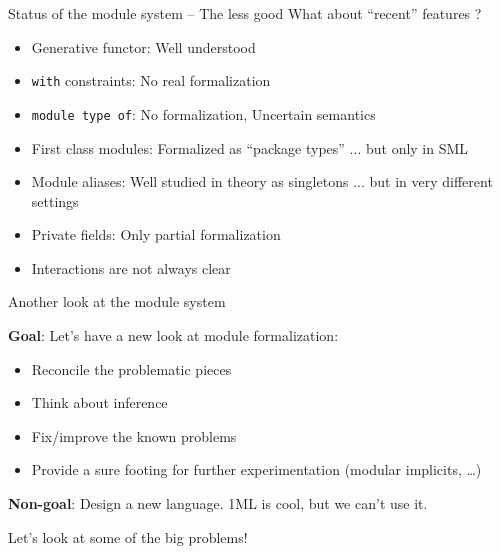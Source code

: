 \documentclass[aspectratio=169,dvipsnames,svgnames,10pt]{beamer}
\newcommand\Y{{\color{Green}{\ding{52}}}\xspace}
\newcommand\N{{\color{Red}{\ding{56}}}\xspace}
\begin{document}



\appendix

\begin{frame}[fragile]{Status of the module system -- The less good}
  What about ``recent'' features ?
  \begin{itemize}
  \item Generative functor:
    Well understood \Y
  \item \texttt{with} constraints: 
    No real formalization \N
  \item \texttt{module type of}:
    No formalization, Uncertain semantics \N
  \item First class modules:
    Formalized as ``package types'' \Y ...
    but only in SML \N
  \item Module aliases:
    Well studied in theory as singletons \Y ...
    but in very different settings \N
  \item Private fields:
    Only partial formalization
  \item<2>
    Interactions are not always clear
  \end{itemize}
\end{frame}



\begin{frame}{Another look at the module system}

  \textbf{Goal}: Let's have a new look at module formalization:
  \begin{itemize}
  \item Reconcile the problematic pieces
  \item Think about inference
  \item Fix/improve the known problems
  \item Provide a sure footing for further experimentation (modular implicits, \dots)
  \end{itemize}

  \pause
  \textbf{Non-goal}: Design a new language. 1ML is cool, but we can't use it.

  \pause
  Let's look at some of the big problems!
\end{frame}
\end{document}
